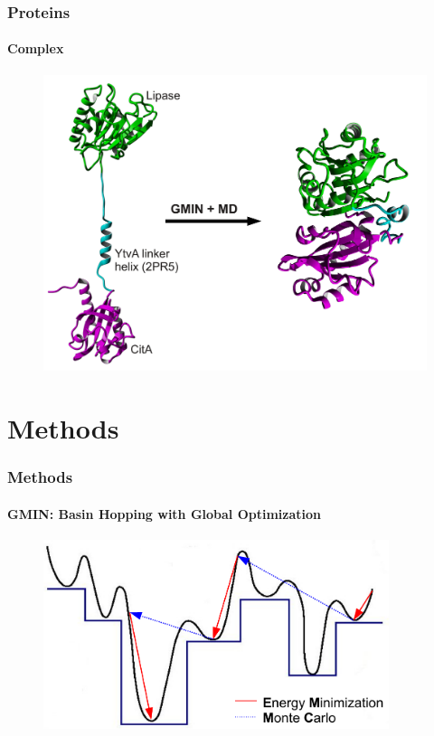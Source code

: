 \documentclass[english]{beamer}
\begin{document}
\begin{frame}
    \frametitle{Proteins}
    \framesubtitle{Complex}

    \begin{figure}
        \includegraphics[width=.9\linewidth]{figures/complex/complex_folding.pdf}
    \end{figure}       

\end{frame}   





\section{Methods}

\begin{frame}
    \frametitle{Methods}
    \framesubtitle{GMIN: Basin Hopping with Global Optimization}

    \begin{figure}
        \includegraphics[width=0.9\textwidth]{figures/GMIN/GMIN.pdf}
    \end{figure}        

\end{frame}    
\end{document}
